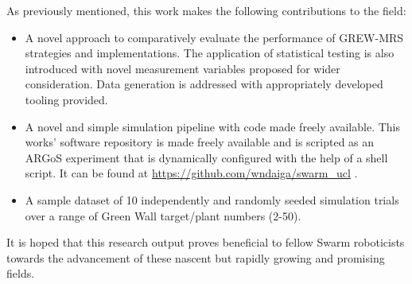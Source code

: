 \documentclass{report}
\begin{document}
As previously mentioned, this work makes the following contributions to the field:

\begin{itemize}
	\item A novel approach to comparatively evaluate the performance of GREW-MRS strategies and implementations. The application of statistical testing is also introduced with novel measurement variables proposed for wider consideration. Data generation is addressed with appropriately developed tooling provided.
	\item A novel and simple simulation pipeline with code made freely available. This works' software repository is made freely available and is scripted as an ARGoS experiment that is dynamically configured with the help of a shell script. It can be found at \url{https://github.com/wndaiga/swarm_ucl} \cite{SWARMCODE}.
	\item A sample dataset of 10 independently and randomly seeded simulation trials over a range of Green Wall target/plant numbers (2-50).
\end{itemize}

It is hoped that this research output proves beneficial to fellow Swarm roboticists towards the advancement of these nascent but rapidly growing and promising fields.

\appendix



\newpage
{}
\end{document}
